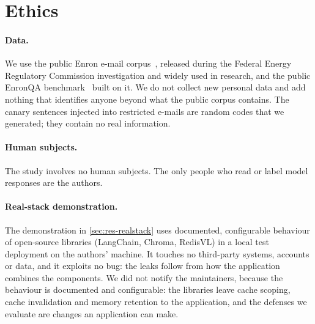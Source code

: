 \section{Ethics}
\label{sec:ethics}

\paragraph{Data.}
We use the public Enron e-mail corpus~\cite{klimt2004enron}, released during the Federal Energy
Regulatory Commission investigation and widely used in research, and the public EnronQA
benchmark~\cite{ryan2025enronqa} built on it. We do not collect new personal data and add nothing that
identifies anyone beyond what the public corpus contains. The canary sentences injected into
restricted e-mails are random codes that we generated; they contain no real information.

\paragraph{Human subjects.}
The study involves no human subjects. The only people who read or label model responses are the
authors.

\paragraph{Real-stack demonstration.}
The demonstration in \cref{sec:res-realstack} uses documented, configurable behaviour of open-source
libraries (LangChain, Chroma, RedisVL) in a local test deployment on the authors' machine. It touches
no third-party systems, accounts or data, and it exploits no bug: the leaks follow from how the
application combines the components. We did not notify the maintainers, because the behaviour is
documented and configurable: the libraries leave cache scoping, cache invalidation and memory
retention to the application, and the defenses we evaluate are changes an application can make.
